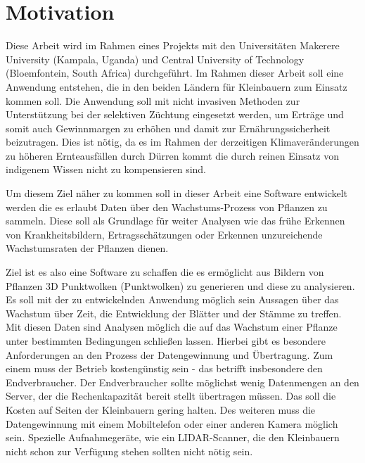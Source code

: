 \documentclass[12pt,titlepage, twoside]{article}
\begin{document}
\pagestyle{plain}
\tableofcontents
\newpage

\renewcommand{\labelenumi}{\alph{enumi})} 



\section{Motivation}
\label{sec:einleitung}
Diese Arbeit wird im Rahmen eines Projekts mit den Universitäten Makerere University (Kampala, Uganda) und Central University of Technology (Bloemfontein, South Africa) durchgeführt.
Im Rahmen dieser Arbeit soll eine Anwendung entstehen, die in den beiden Ländern für Kleinbauern zum Einsatz kommen soll.
Die Anwendung soll mit nicht invasiven Methoden zur Unterstützung bei der selektiven Züchtung eingesetzt werden, um Erträge und somit auch Gewinnmargen zu erhöhen und damit zur Ernährungssicherheit beizutragen.
Dies ist nötig, da es im Rahmen der derzeitigen Klimaveränderungen zu höheren Ernteausfällen durch Dürren kommt \cite{droughts} die durch reinen Einsatz von indigenem Wissen nicht zu kompensieren sind.

Um diesem Ziel näher zu kommen soll in dieser Arbeit eine Software entwickelt werden die es erlaubt Daten über den Wachstums-Prozess von Pflanzen zu sammeln. 
Diese soll als Grundlage für weiter Analysen wie das frühe Erkennen von Krankheitsbildern, Ertragsschätzungen oder Erkennen unzureichende Wachstumsraten der Pflanzen dienen.

Ziel ist es also eine Software zu schaffen die es ermöglicht aus Bildern von Pflanzen 3D Punktwolken (Punktwolken) zu generieren und diese zu analysieren.
Es soll mit der zu entwickelnden Anwendung möglich sein Aussagen über das Wachstum über Zeit, die Entwicklung der Blätter und der Stämme zu treffen. 
Mit diesen Daten sind Analysen möglich die auf das Wachstum einer Pflanze unter bestimmten Bedingungen schließen lassen.
Hierbei gibt es besondere Anforderungen an den Prozess der Datengewinnung und Übertragung. Zum einem muss der Betrieb kostengünstig sein - das betrifft insbesondere den Endverbraucher.
Der Endverbraucher sollte möglichst wenig Datenmengen an den Server, der die Rechenkapazität bereit stellt übertragen müssen. Das soll die Kosten auf Seiten der Kleinbauern gering halten.
Des weiteren muss die Datengewinnung mit einem Mobiltelefon oder einer anderen Kamera möglich sein. 
Spezielle Aufnahmegeräte, wie ein LIDAR-Scanner, die den Kleinbauern nicht schon zur Verfügung stehen sollten nicht nötig sein.
\end{document}
